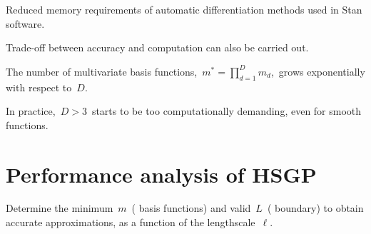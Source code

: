\documentclass[landscape,a1,final]{a0poster} %
\let\tempone\itemize
\let\temptwo\enditemize
\renewenvironment{itemize}{\tempone\addtolength{\itemsep}{-0.3\baselineskip}}{\temptwo}
\begin{document}
\begin{minipage}{1\linewidth}
\begin{minipage}[t]{0.31\textwidth}
\begin{tcolorbox}[colframe=blue!20, colback=white, title=\scriptsize Properties of the HSGP method, colbacktitle=lightblue, coltitle=black, boxrule=0.5pt]
\begin{itemize}
\item[+] Reduced memory requirements of automatic differentiation methods used in Stan  software.

\item[+] Trade-off between accuracy and computation can also be carried out.

\item[-] The number of multivariate basis functions,\, $m^{\ast} = \prod_{d=1}^{D} m_d$,\, grows exponentially with respect to\, $D$.

\item[-] In practice,\, $D>3$\, starts to be too computationally demanding, even for smooth functions.

\end{itemize}
\end{tcolorbox}


\end{minipage}%
\hspace{0.015\linewidth} 
\begin{minipage}[t]{0.31\textwidth}
\vspace{0pt}
\setlength{\parindent}{10mm}


\vspace{0.3cm}
\section{Performance analysis of HSGP}
\vspace{-0.2cm}

\begin{itemize}\setlength\itemsep{2mm}
\item Determine the minimum\, $m$\, ({\color{navyblue} basis functions}) and valid\, $L$\, ({\color{navyblue} boundary}) to obtain accurate approximations, as a function of the {\color{navyblue} lengthscale}\, $\ell$.

%
%

\end{itemize}


\end{minipage}
\end{minipage}
\end{document}
